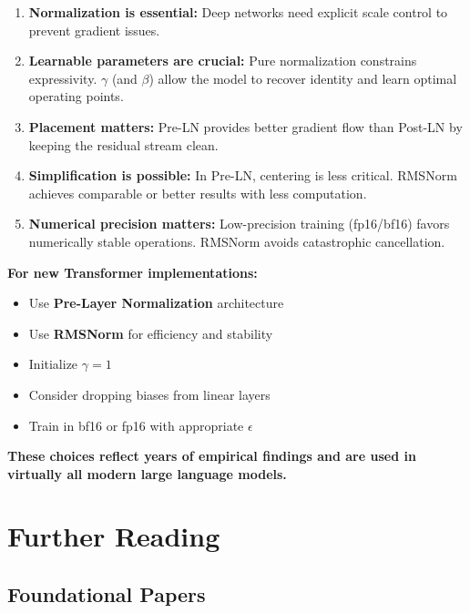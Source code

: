 \documentclass{article}
\begin{document}
\begin{enumerate}
\item \textbf{Normalization is essential:} Deep networks need explicit scale control to prevent gradient issues.

\item \textbf{Learnable parameters are crucial:} Pure normalization constrains expressivity. $\gamma$ (and $\beta$) allow the model to recover identity and learn optimal operating points.

\item \textbf{Placement matters:} Pre-LN provides better gradient flow than Post-LN by keeping the residual stream clean.

\item \textbf{Simplification is possible:} In Pre-LN, centering is less critical. RMSNorm achieves comparable or better results with less computation.

\item \textbf{Numerical precision matters:} Low-precision training (fp16/bf16) favors numerically stable operations. RMSNorm avoids catastrophic cancellation.
\end{enumerate}

\begin{tcolorbox}[colback=blue!5!white, colframe=blue!75!black, title=Modern Best Practices]
\textbf{For new Transformer implementations:}
\begin{itemize}
\item Use \textbf{Pre-Layer Normalization} architecture
\item Use \textbf{RMSNorm} for efficiency and stability
\item Initialize $\gamma = 1$
\item Consider dropping biases from linear layers
\item Train in bf16 or fp16 with appropriate $\epsilon$
\end{itemize}

\textbf{These choices reflect years of empirical findings and are used in virtually all modern large language models.}
\end{tcolorbox}

\section{Further Reading}

\subsection{Foundational Papers}
\end{document}
